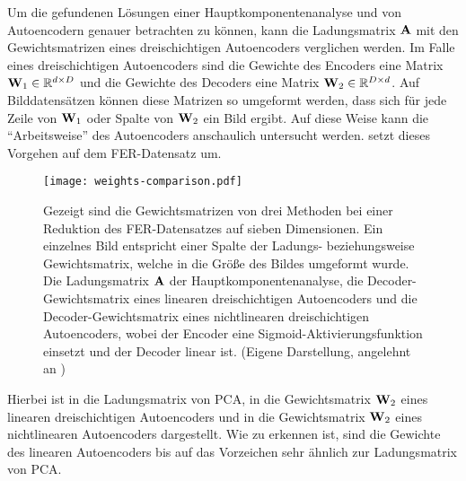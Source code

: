 Um die gefundenen Lösungen einer Hauptkomponentenanalyse und von Autoencodern genauer betrachten zu
können, kann die Ladungsmatrix $\mathbf{A}$ mit den Gewichtsmatrizen eines dreischichtigen
Autoencoders verglichen werden. Im Falle eines dreischichtigen Autoencoders sind die Gewichte des
Encoders eine Matrix $\mathbf{W}_1 \in \mathbb{R}^{d \times D}$ und die Gewichte des Decoders eine Matrix
$\mathbf{W}_2 \in \mathbb{R}^{D \times d}$. Auf Bilddatensätzen können diese Matrizen so umgeformt werden,
dass sich für jede Zeile von $\mathbf{W}_1$ oder Spalte von $\mathbf{W}_2$ ein Bild ergibt. Auf diese
Weise kann die \enquote{Arbeitsweise} des Autoencoders anschaulich untersucht werden.
 setzt dieses Vorgehen auf dem FER-Datensatz um.
\begin{figure}[ht]
	\centering
	\texttt{[image: weights-comparison.pdf]}
	\caption[Die Gewichtsmatrizen von ausgewählten Methoden auf dem FER-Datensatz]{Gezeigt sind die Gewichtsmatrizen von drei Methoden bei einer Reduktion des FER-Datensatzes auf sieben Dimensionen. Ein einzelnes Bild entspricht einer Spalte der Ladungs- beziehungsweise Gewichtsmatrix, welche in die Größe des Bildes umgeformt wurde. \captiona Die Ladungsmatrix $\mathbf{A}$ der Hauptkomponentenanalyse, \captionb die Decoder-Gewichtsmatrix eines linearen dreischichtigen Autoencoders und \captionc die Decoder-Gewichtsmatrix eines nichtlinearen dreischichtigen Autoencoders, wobei der Encoder eine Sigmoid-Aktivierungsfunktion einsetzt und der Decoder linear ist. (Eigene Darstellung, angelehnt an \textcite[5]{Plaut.2018})}
	\label{fig:Gewichtsvergleich}
\end{figure}
Hierbei ist in \captiona die Ladungsmatrix von PCA, in \captionb die Gewichtsmatrix $\mathbf{W}_2$ eines linearen dreischichtigen Autoencoders und in \captionc die Gewichtsmatrix $\mathbf{W}_2$ eines nichtlinearen Autoencoders dargestellt. Wie zu erkennen ist, sind
die Gewichte des linearen Autoencoders bis auf das Vorzeichen sehr ähnlich zur Ladungsmatrix von
PCA.
